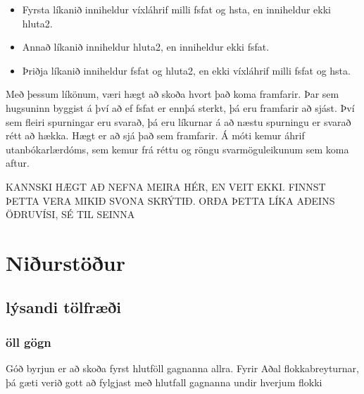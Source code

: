\documentclass[
  12pt,
]{article}
\providecommand{\tightlist}{%
  \setlength{\itemsep}{0pt}\setlength{\parskip}{0pt}}
\begin{document}
\begin{itemize}
\tightlist
\item
  Fyrsta líkanið inniheldur víxláhrif milli fsfat og hsta, en inniheldur ekki hluta2.
\item
  Annað líkanið inniheldur hluta2, en inniheldur ekki fsfat.
\item
  Þriðja líkanið inniheldur fsfat og hluta2, en ekki víxláhrif milli fsfat og hsta.
\end{itemize}

Með þessum líkönum, væri hægt að skoða hvort það koma framfarir. Þar sem hugsuninn byggist á því að ef fsfat er ennþá sterkt, þá eru framfarir að sjást. Því sem fleiri spurningar eru svarað, þá eru líkurnar á að næstu spurningu er svarað rétt að hækka. Hægt er að sjá það sem framfarir. Á móti kemur áhrif utanbókarlærdóms, sem kemur frá réttu og röngu svarmöguleikunum sem koma aftur.

KANNSKI HÆGT AÐ NEFNA MEIRA HÉR, EN VEIT EKKI. FINNST ÞETTA VERA MIKIÐ SVONA SKRÝTIÐ. ORÐA ÞETTA LÍKA AÐEINS ÖÐRUVÍSI, SÉ TIL SEINNA

\hypertarget{niuxf0urstuxf6uxf0ur}{%
\section{Niðurstöður}\label{niuxf0urstuxf6uxf0ur}}

\hypertarget{luxfdsandi-tuxf6lfruxe6uxf0i}{%
\subsection{lýsandi tölfræði}\label{luxfdsandi-tuxf6lfruxe6uxf0i}}

\hypertarget{uxf6ll-guxf6gn}{%
\subsubsection{öll gögn}\label{uxf6ll-guxf6gn}}

Góð byrjun er að skoða fyrst hlutföll gagnanna allra. Fyrir Aðal flokkabreyturnar, þá gæti verið gott að fylgjast með hlutfall gagnanna undir hverjum flokki
\end{document}
